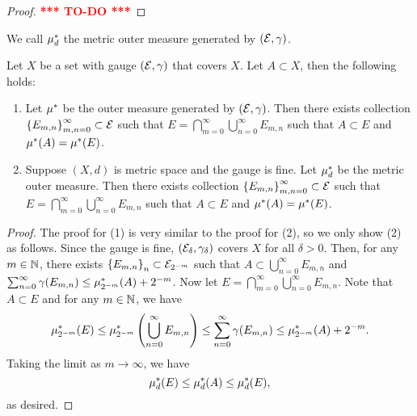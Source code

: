 \documentclass[a4paper]{article}
\newcommand{\TODO}{\textcolor{red}{\textbf{*** TO-DO ***}}}
\renewcommand{\cupinfn}{\bigcup_{n=0}^\infty}
\renewcommand{\suminfn}{\sum_{n=0}^\infty}
\renewcommand{\capinfm}{\bigcap_{m=0}^\infty}
\begin{document}
\begin{proof}
  \TODO
\end{proof}

\begin{defi}
  We call $\mu^*_d$ the metric outer measure generated
  by $(\mathcal{E}, \gamma)$.
\end{defi}

\begin{lemma}
  Let $X$ be a set with gauge $(\mathcal{E}, \gamma)$ that covers
  $X$. Let $A \subset X$, then the following holds:
  \begin{enumerate}
    \item Let $\mu^*$ be the outer measure generated
    by $(\mathcal{E}, \gamma)$. Then there exists collection
    $\left\{ E_{m,n} \right\}_{m, n= 0}^\infty \subset \mathcal{E}$
    such that $E = \capinfm \cupinfn E_{m, n}$ such that
    $A \subset E$ and $\mu^*(A) = \mu^*(E)$.

    \item Suppose $(X, d)$ is metric space and the gauge is
    fine.
    Let $\mu^*_d$ be the metric outer measure. Then there exists collection
    $\left\{ E_{m,n} \right\}_{m, n= 0}^\infty \subset \mathcal{E}$
    such that $E = \capinfm \cupinfn E_{m, n}$ such that
    $A \subset E$ and $\mu^*(A) = \mu^*(E)$.
  \end{enumerate}
\end{lemma}

\begin{proof}
The proof for (1) is very similar to the proof for (2),
so we only show (2) as follows.
Since the gauge is fine, $(\mathcal{E}_\delta, \gamma_\delta)$
covers $X$ for all $\delta > 0$. Then, for any $m \in \mathbb{N}$,
there exists $\left\{ E_{m, n} \right\}_{n} \subset
\mathcal{E}_{2^{-m}}$ such that $A \subset \cupinfn E_{m, n}$
and $\suminfn \gamma(E_{m, n}) \leq \om_{2^{-m}}(A) + 2^{-m}$.
Now let $E = \capinfm \cupinfn E_{m, n}$. Note that
$A \subset E$ and for any $m \in \mathbb{N}$, we have
\[
\om_{2^{-m}} (E) \leq \om_{2^{-m}} \left( \cupinfn E_{m, n} \right)
\leq \suminfn \gamma(E_{m, n}) \leq \om_{2^{-m}} (A) + 2^{-m}.
\]
Taking the limit as $m \to \infty$, we have
\[
\mu^*_d (E) \leq \mu^*_d(A) \leq \mu^*_d(E),
\]
as desired.

\end{proof}
\end{document}
